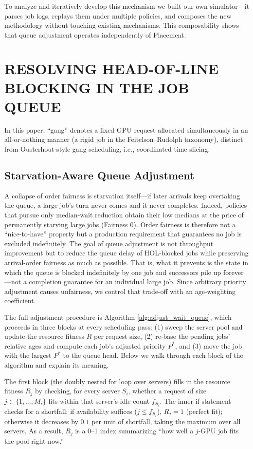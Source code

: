 \documentclass{ieeetj}
\begin{document}
To analyze and iteratively develop this mechanism we built our own simulator---it parses job logs, replays them under multiple policies, and composes the new methodology without touching existing mechanisms. This composability shows that queue adjustment operates independently of Placement.

\section{RESOLVING HEAD-OF-LINE BLOCKING IN THE JOB QUEUE}\label{algo:intro}
In this paper, ``gang'' denotes a fixed GPU request allocated simultaneously in an all-or-nothing manner (a rigid job in the Feitelson--Rudolph taxonomy\cite{feitelson1996toward}), distinct from Ousterhout-style gang scheduling\cite{ousterhout1982gang}, i.e., coordinated time slicing.
\subsection{Starvation-Aware Queue Adjustment}
A collapse of order fairness is starvation itself---if later arrivals keep overtaking the queue, a large job's turn never comes and it never completes. Indeed, policies that pursue only median-wait reduction obtain their low medians at the price of permanently starving large jobs (Fairness 0). Order fairness is therefore not a ``nice-to-have'' property but a production requirement that guarantees no job is excluded indefinitely. The goal of queue adjustment is not throughput improvement but to reduce the queue delay of HOL-blocked jobs while preserving arrival-order fairness as much as possible. That is, what it prevents is the state in which the queue is blocked indefinitely by one job and successors pile up forever---not a completion guarantee for an individual large job. Since arbitrary priority adjustment causes unfairness, we control that trade-off with an age-weighting coefficient.

The full adjustment procedure is Algorithm \ref{alg:adjust_wait_queue}, which proceeds in three blocks at every scheduling pass: (1) sweep the server pool and update the resource fitness $R$ per request size, (2) re-base the pending jobs' relative ages and compute each job's adjusted priority $P^*$, and (3) move the job with the largest $P^*$ to the queue head. Below we walk through each block of the algorithm and explain its meaning.

The first block (the doubly nested for loop over servers) fills in the resource fitness $R_j$ by checking, for every server $S_i$, whether a request of size $j\in\{1,\dots,M_i\}$ fits within that server's idle count $f_{S_i}$. The inner if statement checks for a shortfall: if availability suffices ($j\le f_{S_i}$), $R_j=1$ (perfect fit); otherwise it decreases by $0.1$ per unit of shortfall, taking the maximum over all servers. As a result, $R_j$ is a 0--1 index summarizing ``how well a $j$-GPU job fits the pool right now.''
\end{document}
